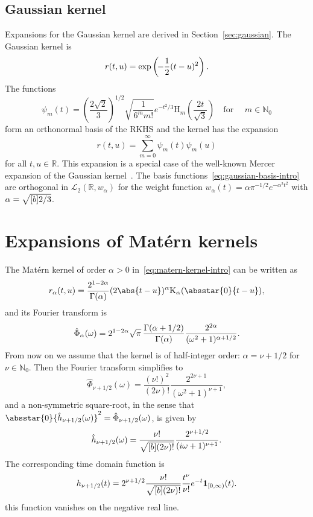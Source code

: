 \documentclass{article}
\newcommand{\tmcolor}[2]{{\color{#1}{#2}}}
\newcommand{\R}{\mathbb{R}}
\newcommand{\N}{\mathbb{N}}
\newcommand{\rev}[1]{\tmcolor{black}{#1}}
\begin{document}
\subsection{Gaussian kernel}

Expansions for the Gaussian kernel are derived in  Section~\ref{sec:gaussian}.
The Gaussian kernel is
\[ r (t, u) = \exp \left( \hspace{-0.17em} - \frac{1}{2} (t - u)^2 \right) .
\]
The functions
\begin{equation}
  \label{eq:gaussian-basis-intro} \psi_m (t) = \left( \frac{2 \sqrt{2}}{3}
  \right)^{1 / 2} \sqrt{\frac{1}{6^m m!}} e^{- t^2 / 3} \mathrm{H}_m \left(
  \frac{2 t}{\sqrt{3}} \right)  \quad \text{for } \quad m \in \N_0
\end{equation}
form an orthonormal basis of the RKHS and the kernel has the expansion
\[ r (t, u) = \sum_{m = 0}^{\infty} \psi_m (t) \psi_m (u) \]
for all $t, u \in \R$. This expansion is a special case of the well-known
Mercer expansion of the Gaussian
kernel~{\cite[Section~12.2.1]{FasshauerMcCourt2015}}. The basis
functions~\eqref{eq:gaussian-basis-intro} are orthogonal in $\mathscr{L}_2
(\R, w_{\alpha})$ for the weight function $w_{\alpha} (t) = \alpha \pi^{- 1 /
2} e^{- \alpha^2 t^2}$ with $\alpha = \sqrt{\smash{[} b] 2 / 3}$.

\section{Expansions of Mat{\'e}rn kernels}\label{sec:matern}

The Mat{\'e}rn kernel of order $\alpha > 0$ in~\eqref{eq:matern-kernel-intro}
can be written as
\[ r_{\alpha} (t, u) = \frac{2^{1 - 2 \alpha}}{\Gamma (\alpha)} (2 \abs{t -
   u})^{\alpha} \mathrm{K}_{\alpha} (\absstar{0}{t - u}), \]
and its Fourier transform is~{\rev{{\citep{[}}Theorem~6.13]Wendland2005}}
\[ \hat{\Phi}_{\alpha} (\omega) = 2^{1 - 2 \alpha}  \sqrt{\pi} 
   \hspace{0.17em} \frac{\Gamma (\alpha + 1 / 2)}{\Gamma (\alpha)}  \frac{2^{2
   \alpha}}{(\omega^2 + 1)^{\alpha + 1 / 2}} . \]
From now on we assume that the kernel is of half-integer order: $\alpha = \nu
+ 1 / 2$ for $\nu \in \N_0$. Then the Fourier transform simplifies to
\[ \hat{\Phi}_{\nu + 1 / 2} (\omega) = \frac{(\nu !)^2}{(2 \nu) !}  \frac{2^{2
   \nu + 1}}{(\omega^2 + 1)^{\nu + 1}}, \]
and a non-symmetric square-root, in the sense that $\absstar{0}{\hat{h}_{\nu +
1 / 2} (\omega)}^2 = \hat{\Phi}_{\nu + 1 / 2} (\omega)$, is given by
\begin{equation}
  \label{eq:h-hat-matern} \hat{h}_{\nu + 1 / 2} (\omega) = \frac{\nu
  !}{\sqrt{\smash{[} b] (2 \nu) !}}  \frac{2^{\nu + 1 / 2}}{(i \omega +
  1)^{\nu + 1}} .
\end{equation}
The corresponding time domain function is~{\cite[Section~1.03]{Wiener1949}}
\begin{equation}
  \label{eq:h-matern} h_{\nu + 1 / 2} (t) = 2^{\nu + 1 / 2}  \frac{\nu
  !}{\sqrt{\smash{[} b] (2 \nu) !}}  \frac{t^{\nu}}{\nu !} e^{- t} 
  \textbf{1}_{[0, \infty)} (t) .
\end{equation}
{\rev{Note that}} this function vanishes on the negative real line.
\end{document}
